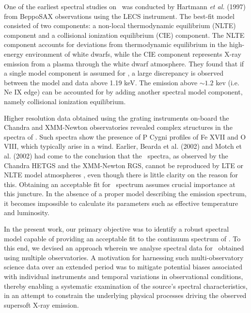 	One of the earliest spectral studies on \source\ was conducted by Hartmann \textit{et al.} (1997) \cite{hartmann1999constraining} from BeppoSAX observations using the LECS instrument. The best-fit model consisted of two components: a non-local thermodynamic equilibrium (NLTE) component and a collisional ionization equilibrium (CIE) component. The NLTE component accounts for deviations from thermodynamic equilibrium in the high-energy environment of white dwarfs, while the CIE component represents X-ray emission from a plasma through the white dwarf atmosphere. %
	They found that if a single model component is assumed for \source, a large discrepancy is observed between the model and data above 1.19 keV. The emission above $\sim 1.2$ kev (i.e. Ne IX edge) can be accounted for by adding another spectral model component, namely collisional ionization equilibrium.
	
	Higher resolution data obtained using the grating instruments on-board the Chandra and XMM-Newton observatories revealed complex structures in the spectra of \source. Such spectra show the presence of P Cygni profiles of Fe XVII and O VIII, which typically arise in a wind. Earlier, Bearda et al. (2002) and Motch et al. (2002) had come to the conclusion that the \source\ spectra, as observed by the Chandra HETGS and the XMM-Newton RGS, cannot be reproduced by LTE or NLTE model atmospheres \cite{beardaChandra2002AA,motchXmmNewton2002AA}, even though there is little clarity on the reason for this. Obtaining an acceptable fit for \source\ spectrum assumes crucial importance at this juncture. In the absence of a proper model describing the emission spectrum, it becomes impossible to calculate its parameters such as effective temperature and luminosity.
	
	In the present work, our primary objective was to identify a robust spectral model capable of providing an acceptable fit to the continuum spectrum of \source. To this end, we devised an approach wherein we analyse spectral data for \source\ obtained using multiple observatories. A motivation for harnessing such multi-observatory science data over an extended period was to mitigate potential biases associated with individual instruments and temporal variations in observational conditions, thereby enabling a systematic examination of the source's spectral characteristics, in an attempt to constrain the underlying physical processes driving the observed supersoft X-ray emission.
	
